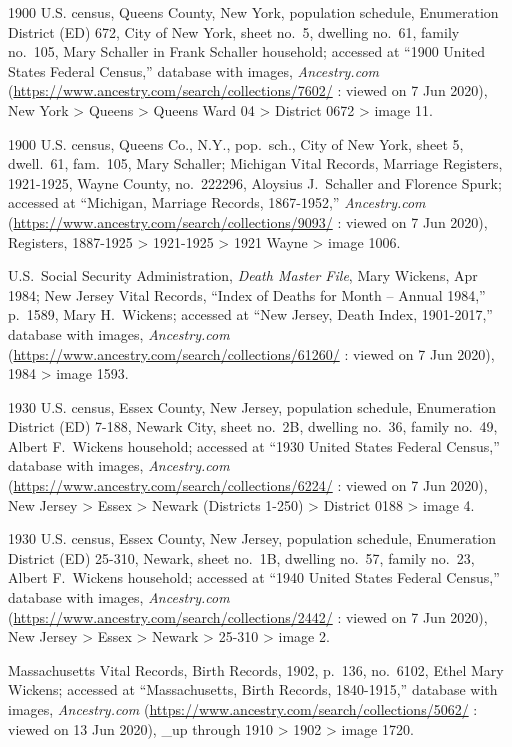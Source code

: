 \begin{thebibliography}{999}
1900 U.S. census, Queens County, New York, population schedule, Enumeration District (ED) 672, City of New York, sheet no.\ 5, dwelling no.\ 61, family no.\ 105, Mary Schaller in Frank Schaller household; accessed at ``1900 United States Federal Census,'' database with images, \textit{Ancestry.com} (\url{https://www.ancestry.com/search/collections/7602/} : viewed on 7 Jun 2020), New York > Queens > Queens Ward 04 > District 0672 > image 11.

1900 U.S. census, Queens Co., N.Y., pop.\ sch., City of New York, sheet 5, dwell.\ 61, fam.\ 105, Mary Schaller; Michigan Vital Records, Marriage Registers, 1921-1925, Wayne County, no.\ 222296, Aloysius J.\ Schaller and Florence Spurk; accessed at ``Michigan, Marriage Records, 1867-1952,'' \textit{Ancestry.com} (\url{https://www.ancestry.com/search/collections/9093/} : viewed on 7 Jun 2020), Registers, 1887-1925 > 1921-1925 > 1921 Wayne > image 1006.

U.S.\ Social Security Administration, \textit{Death Master File}, Mary Wickens, Apr 1984; New Jersey Vital Records, ``Index of Deaths for Month -- Annual 1984,'' p.\ 1589, Mary H.\ Wickens; accessed at ``New Jersey, Death Index, 1901-2017,'' database with images, \textit{Ancestry.com} (\url{https://www.ancestry.com/search/collections/61260/} : viewed on 7 Jun 2020), 1984 > image 1593.

1930 U.S. census, Essex County, New Jersey, population schedule, Enumeration District (ED) 7-188, Newark City, sheet no.\ 2B, dwelling no.\ 36, family no.\ 49, Albert F.\ Wickens household; accessed at ``1930 United States Federal Census,'' database with images, \textit{Ancestry.com} (\url{https://www.ancestry.com/search/collections/6224/} : viewed on 7 Jun 2020), New Jersey > Essex > Newark (Districts 1-250) > District 0188 > image 4.

1930 U.S. census, Essex County, New Jersey, population schedule, Enumeration District (ED) 25-310, Newark, sheet no.\ 1B, dwelling no.\ 57, family no.\ 23, Albert F.\ Wickens household; accessed at ``1940 United States Federal Census,'' database with images, \textit{Ancestry.com} (\url{https://www.ancestry.com/search/collections/2442/} : viewed on 7 Jun 2020), New Jersey > Essex > Newark > 25-310 > image 2.


Massachusetts Vital Records, Birth Records, 1902, p.\ 136, no.\ 6102, Ethel Mary Wickens; accessed at ``Massachusetts, Birth Records, 1840-1915,'' database with images, \textit{Ancestry.com} (\url{https://www.ancestry.com/search/collections/5062/} : viewed on 13 Jun 2020), \_up through 1910 > 1902 > image 1720.


\end{thebibliography}
